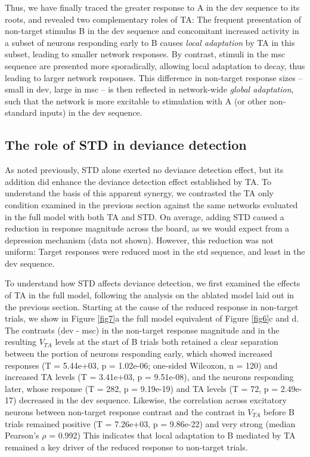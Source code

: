 \documentclass[pdflatex,referee,iicol,sn-basic]{sn-jnl}
\theoremstyle{thmstyleone}%
\theoremstyle{thmstyletwo}%
\theoremstyle{thmstylethree}%
\begin{document}
Thus, we have finally traced the greater response to A in the dev sequence to its roots, and revealed two complementary roles of TA: The frequent presentation of non-target stimulus B in the dev sequence and concomitant increased activity in a subset of neurons responding early to B causes \emph{local adaptation} by TA in this subset, leading to smaller network responses. By contrast, stimuli in the msc sequence are presented more sporadically, allowing local adaptation to decay, thus leading to larger network responses. This difference in non-target response sizes -- small in dev, large in msc -- is then reflected in network-wide \emph{global adaptation}, such that the network is more excitable to stimulation with A (or other non-standard inputs) in the dev sequence.

\subsection{The role of STD in deviance detection}\label{sec-std}

As noted previously, STD alone exerted no deviance detection effect, but its addition did enhance the deviance detection effect established by TA. To understand the basis of this apparent synergy, we contrasted the TA only condition examined in the previous section against the same networks evaluated in the full model with both TA and STD. On average, adding STD caused a reduction in response magnitude across the board, as we would expect from a depression mechanism (data not shown). However, this reduction was not uniform: Target responses were reduced most in the std sequence, and least in the dev sequence.

To understand how STD affects deviance detection, we first examined the effects of TA in the full model, following the analysis on the ablated model laid out in the previous section. Starting at the cause of the reduced response in non-target trials, we show in Figure \ref{fig7}a the full model equivalent of Figure \ref{fig6}c and d. The contrasts (dev - msc) in the non-target response magnitude and in the resulting $V_{TA}$ levels at the start of B trials both retained a clear separation between the portion of neurons responding early, which showed increased responses (T = 5.44e+03, p = 1.02e-06; one-sided Wilcoxon, n = 120) and increased TA levels (T = 3.41e+03, p = 9.51e-08), and the neurons responding later, whose response (T = 282, p = 9.19e-19) and TA levels (T = 72, p = 2.49e-17) decreased in the dev sequence. Likewise, the correlation across excitatory neurons between non-target response contrast and the contrast in $V_{TA}$ before B trials remained positive (T = 7.26e+03, p = 9.86e-22) and very strong (median Pearson's $\rho$ = 0.992) This indicates that local adaptation to B mediated by TA remained a key driver of the reduced response to non-target trials.
\end{document}

